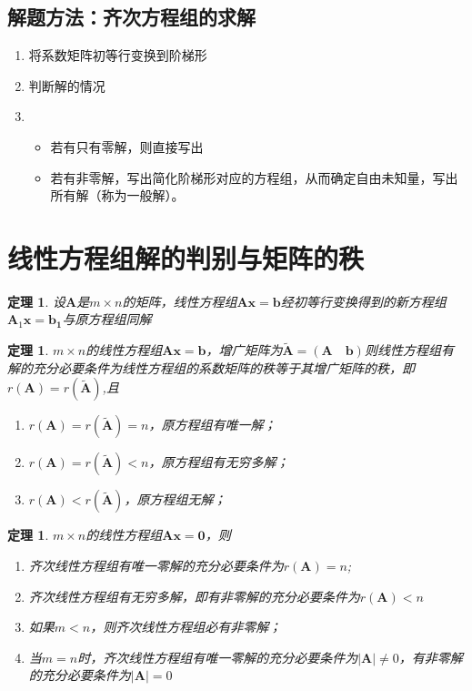 \documentclass[12pt,oneside]{ctexbook}
\newtheorem{theorem}[subsection]{定理}
\begin{document}
\subsection{解题方法：齐次方程组的求解}
\begin{enumerate}
    \item 将系数矩阵初等行变换到阶梯形
    \item 判断解的情况
    \item {\begin{itemize}
        \item 若有只有零解，则直接写出
        \item 若有非零解，写出简化阶梯形对应的方程组，从而确定自由未知量，写出所有解（称为一般解）。
        \end{itemize}}
\end{enumerate}

\section{线性方程组解的判别与矩阵的秩}
\label{equation&r}
\begin{theorem}
    设\(\mathbf{A}\)是\(m \times n\)的矩阵，线性方程组\(\mathbf{A}\mathbf{x}=\mathbf{b}\)经初等行变换得到的新方程组\(\mathbf{A}_1\mathbf{x}=\mathbf{b_1}\)与原方程组同解
\end{theorem}

\begin{theorem}
    \(m \times n\)的线性方程组\(\mathbf{A}\mathbf{x}=\mathbf{b}\)，增广矩阵为\(\tilde{\mathbf{A}}=(\mathbf{A} \quad \mathbf{b})\)则线性方程组有解的充分必要条件为线性方程组的系数矩阵的秩等于其增广矩阵的秩，即\(r(\mathbf{A})=r(\tilde{\mathbf{A}})\),且
    \begin{enumerate}
        \item \(r(\mathbf{A})=r(\tilde{\mathbf{A}})=n\)，原方程组有唯一解；
        \item \(r(\mathbf{A})=r(\tilde{\mathbf{A}})<n\)，原方程组有无穷多解；
        \item \(r(\mathbf{A})<r(\tilde{\mathbf{A}})\)，原方程组无解；
    \end{enumerate}
\end{theorem}

\begin{theorem}
    \(m \times n\)的线性方程组\(\mathbf{A}\mathbf{x}=\mathbf{0}\)，则
    \begin{enumerate}
        \item 齐次线性方程组有唯一零解的充分必要条件为\(r(\mathbf{A})=n\);
        \item 齐次线性方程组有无穷多解，即有非零解的充分必要条件为\(r(\mathbf{A})<n\)
        \item 如果\(m<n\)，则齐次线性方程组必有非零解；
        \item 当\(m=n\)时，齐次线性方程组有唯一零解的充分必要条件为\(\rvert \mathbf{A} \rvert \neq 0\)，有非零解的充分必要条件为\(\rvert \mathbf{A} \rvert = 0\)
    \end{enumerate}
\end{theorem}
\end{document}
